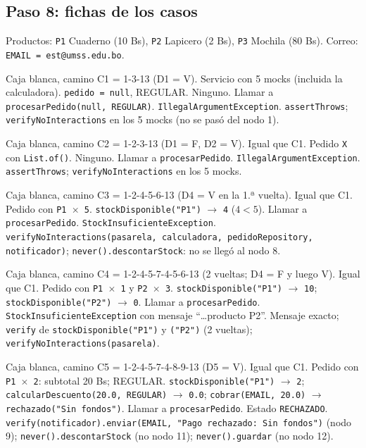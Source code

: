 \documentclass[11pt,a4paper,oneside]{report}
\newcommand{\code}[1]{\texttt{#1}}
\begin{document}
\subsection{Paso 8: fichas de los casos}
Productos: \code{P1} Cuaderno (10 Bs), \code{P2} Lapicero (2 Bs), \code{P3} Mochila (80 Bs). Correo: \code{EMAIL = est@umss.edu.bo}.

{Caja blanca, camino C1 = 1-3-13 (D1 = V).}
{Servicio con 5 mocks (incluida la calculadora).}
{\code{pedido = null}, REGULAR.}
{Ninguno.}
{Llamar a \code{procesarPedido(null, REGULAR)}.}
{\code{IllegalArgumentException}.}
{\code{assertThrows}; \code{verifyNoInteractions} en los 5 mocks (no se pasó del nodo 1).}

{Caja blanca, camino C2 = 1-2-3-13 (D1 = F, D2 = V).}
{Igual que C1.}
{Pedido \code{X} con \code{List.of()}.}
{Ninguno.}
{Llamar a \code{procesarPedido}.}
{\code{IllegalArgumentException}.}
{\code{assertThrows}; \code{verifyNoInteractions} en los 5 mocks.}

{Caja blanca, camino C3 = 1-2-4-5-6-13 (D4 = V en la 1.ª vuelta).}
{Igual que C1.}
{Pedido con \code{P1 $\times$ 5}.}
{\code{stockDisponible("P1")} $\rightarrow$ \code{4} ($4 < 5$).}
{Llamar a \code{procesarPedido}.}
{\code{StockInsuficienteException}.}
{\code{verifyNoInteractions(pasarela, calculadora, pedidoRepository, notificador)}; \code{never().descontarStock}: no se llegó al nodo 8.}

{Caja blanca, camino C4 = 1-2-4-5-7-4-5-6-13 (2 vueltas; D4 = F y luego V).}
{Igual que C1.}
{Pedido con \code{P1 $\times$ 1} y \code{P2 $\times$ 3}.}
{\code{stockDisponible("P1")} $\rightarrow$ \code{10}; \code{stockDisponible("P2")} $\rightarrow$ \code{0}.}
{Llamar a \code{procesarPedido}.}
{\code{StockInsuficienteException} con mensaje ``\ldots producto P2''.}
{Mensaje exacto; \code{verify} de \code{stockDisponible("P1")} y \code{("P2")} (2 vueltas); \code{verifyNoInteractions(pasarela)}.}

{Caja blanca, camino C5 = 1-2-4-5-7-4-8-9-13 (D5 = V).}
{Igual que C1.}
{Pedido con \code{P1 $\times$ 2}: subtotal 20 Bs; REGULAR.}
{\code{stockDisponible("P1")} $\rightarrow$ \code{2}; \code{calcularDescuento(20.0, REGULAR)} $\rightarrow$ \code{0.0}; \code{cobrar(EMAIL, 20.0)} $\rightarrow$ \code{rechazado("Sin fondos")}.}
{Llamar a \code{procesarPedido}.}
{Estado \code{RECHAZADO}.}
{\code{verify(notificador).enviar(EMAIL, "Pago rechazado: Sin fondos")} (nodo 9); \code{never().descontarStock} (no nodo 11); \code{never().guardar} (no nodo 12).}
\end{document}
